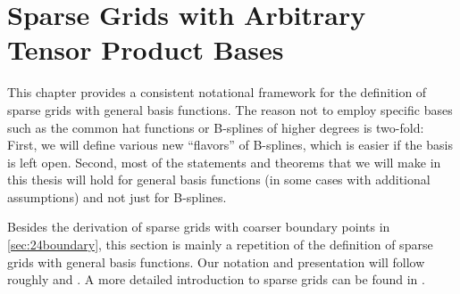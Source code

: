 
\chapter{Sparse Grids with Arbitrary Tensor Product Bases}
\label{chap:20sparseGrids}


This chapter provides a consistent notational framework
for the definition of sparse grids with general basis functions.
The reason not to employ specific bases such as the common hat functions
or B-splines of higher degrees is two-fold:
First, we will define various new ``flavors'' of B-splines,
which is easier if the basis is left open.
Second, most of the statements and theorems that we will make in this
thesis will hold for general basis functions
(in some cases with additional assumptions)
and not just for B-splines.

Besides the derivation of sparse grids with
coarser boundary points in \cref{sec:24boundary},
this section is mainly
a repetition of the definition of sparse grids with general basis functions.
Our notation and presentation will follow roughly
\cite{Pflueger10Spatially} and \cite{Garcke13Sparse}.
A more detailed introduction to sparse grids can be found in
\cite{Bungartz04Sparse}.







